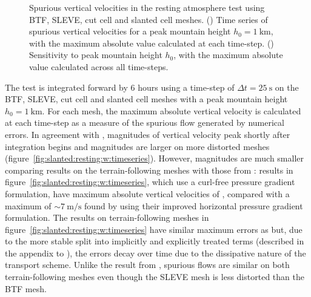\begin{figure}
	\centering
	\begin{subfigure}{\textwidth}
		\centering
		
		\label{fig:slanted:resting:w:timeseries}
		\label{fig:slanted:resting:w:max}
	\end{subfigure}
	\caption{Spurious vertical velocities in the resting atmosphere test using BTF, SLEVE, cut cell and slanted cell meshes.
	() Time series of spurious vertical velocities for a peak mountain height $h_0 = \SI{1}{\kilo\meter}$, with the maximum absolute value calculated at each time-step. 
	() Sensitivity to peak mountain height $h_0$, with the maximum absolute value calculated across all time-steps.
	}
	\label{fig:slanted:resting:w}
\end{figure}

The test is integrated forward by \num{6} hours using a time-step of $\Delta t = \SI{25}{\second}$ on the BTF, SLEVE, cut cell and slanted cell meshes with a peak mountain height $h_0 = \SI{1}{\kilo\meter}$.
For each mesh, the maximum absolute vertical velocity is calculated at each time-step as a measure of the spurious flow generated by numerical errors.  In agreement with \citep{klemp2011}, magnitudes of vertical velocity peak shortly after integration begins and magnitudes are larger on more distorted meshes (figure~\ref{fig:slanted:resting:w:timeseries}).
However, magnitudes are much smaller comparing results on the terrain-following meshes with those from \citet{klemp2011}: results in figure~\ref{fig:slanted:resting:w:timeseries}, which use a curl-free pressure gradient formulation, have maximum absolute vertical velocities of \unskip, compared with a maximum of $\sim \SI{7}{\meter\per\second}$ found by \citet{klemp2011} using their improved horizontal pressure gradient formulation.
The results on terrain-following meshes in figure~\ref{fig:slanted:resting:w:timeseries} have similar maximum errors as \citet{weller-shahrokhi2014} but, due to the more stable split into implicitly and explicitly treated terms (described in the appendix to \citet{shaw-weller2016}), the errors decay over time due to the dissipative nature of the transport scheme.
Unlike the result from \citet{klemp2011}, spurious flows are similar on both terrain-following meshes even though the SLEVE mesh is less distorted than the BTF mesh.

